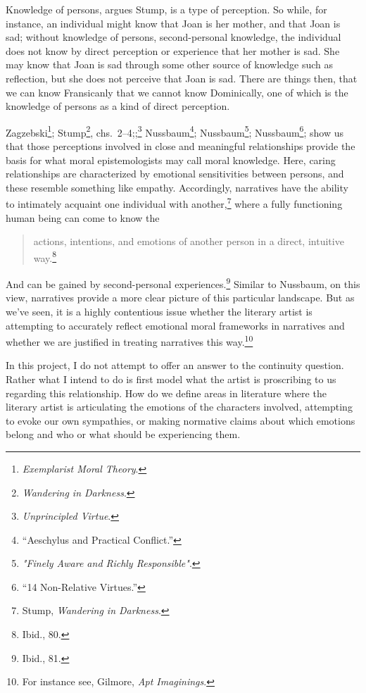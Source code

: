 \documentclass[phdthesis,12pt,final,a4paper]{wuthesis}
\theoremstyle{definition}
\theoremstyle{definition}
\theoremstyle{definition}
\theoremstyle{definition}
\theoremstyle{remark}
\begin{document}
Knowledge of persons, argues Stump, is a type of perception. So while, for instance, an individual might know that Joan is her mother, and that Joan is sad; without knowledge of persons, second-personal knowledge, the individual does not know by direct perception or experience that her mother is sad. She may know that Joan is sad through some other source of knowledge such as reflection, but she does not perceive that Joan is sad. There are things then, that we can know Fransicanly that we cannot know Dominically, one of which is the knowledge of persons as a kind of direct perception.

Zagzebski\footnote{\emph{Exemplarist {Moral Theory}}.}; Stump\footnote{\emph{Wandering in {Darkness}}.}, chs.~2--4;;\footnote{\emph{Unprincipled {Virtue}}.} Nussbaum\footnote{{``Aeschylus and Practical Conflict.''}}; Nussbaum\footnote{\emph{"{Finely Aware} and {Richly Responsible}"}.}; Nussbaum\footnote{{``14 {Non-Relative Virtues}.''}}; show us that those perceptions involved in close and meaningful relationships provide the basis for what moral epistemologists may call moral knowledge. Here, caring relationships are characterized by emotional sensitivities between persons, and these resemble something like empathy. Accordingly, narratives have the ability to intimately acquaint one individual with another,\footnote{Stump, \emph{Wandering in {Darkness}}.} where a fully functioning human being can come to know the

\begin{quote}
actions, intentions, and emotions of another person in a direct, intuitive way.\footnote{Ibid., 80.}
\end{quote}

\noindent And can be gained by second-personal experiences.\footnote{Ibid., 81.} Similar to Nussbaum, on this view, narratives provide a more clear picture of this particular landscape. But as we've seen, it is a highly contentious issue whether the literary artist is attempting to accurately reflect emotional moral frameworks in narratives and whether we are justified in treating narratives this way.\footnote{For instance see, Gilmore, \emph{Apt {Imaginings}}.}

\noindent In this project, I do not attempt to offer an answer to the continuity question. Rather what I intend to do is first model what the artist is proscribing to us regarding this relationship. How do we define areas in literature where the literary artist is articulating the emotions of the characters involved, attempting to evoke our own sympathies, or making normative claims about which emotions belong and who or what should be experiencing them.
\end{document}
